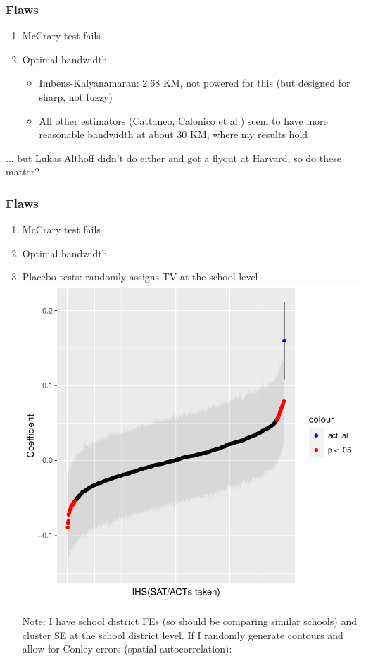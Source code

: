 \documentclass{beamer}
\begin{document}
\begin{frame}
\frametitle{Flaws}
\begin{enumerate}
\item McCrary test fails

\item Optimal bandwidth 
\begin{itemize}
\item Imbens-Kalyanamaran: 2.68 KM, not powered for this (but designed for sharp, not fuzzy)
\item All other estimators (Cattaneo, Calonico et al.) seem to have more reasonable bandwidth at about 30 KM, where my results hold
\end{itemize}

\end{enumerate}

... but Lukas Althoff didn't do either and got a flyout at Harvard, so do these matter?
\end{frame}

\begin{frame}
\frametitle{Flaws}
\begin{enumerate}
\item McCrary test fails

\item Optimal bandwidth 

\item Placebo tests: randomly assigns TV at the school level \\
\includegraphics[width=.4\textwidth]{../../analysis/Output/graphs/placebo_random_1.pdf} 

Note: I have school district FEs (so should be comparing similar schools) and cluster SE at the school district level. If I randomly generate contours and allow for Conley errors (spatial autocorrelation):
\end{enumerate}

\end{frame}
\end{document}
